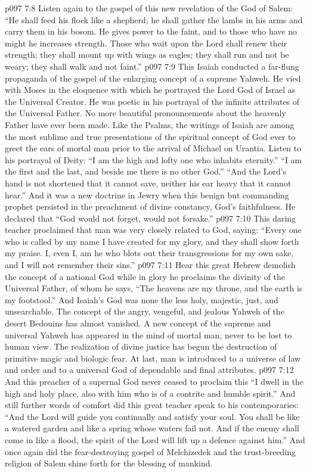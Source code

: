 \vs p097 7:8 Listen again to the gospel of this new revelation of the God of Salem: “He shall feed his flock like a shepherd; he shall gather the lambs in his arms and carry them in his bosom. He gives power to the faint, and to those who have no might he increases strength. Those who wait upon the Lord shall renew their strength; they shall mount up with wings as eagles; they shall run and not be weary; they shall walk and not faint.”
\vs p097 7:9 This Isaiah conducted a far\hyp{}flung propaganda of the gospel of the enlarging concept of a supreme Yahweh. He vied with Moses in the eloquence with which he portrayed the Lord God of Israel as the Universal Creator. He was poetic in his portrayal of the infinite attributes of the Universal Father. No more beautiful pronouncements about the heavenly Father have ever been made. Like the Psalms, the writings of Isaiah are among the most sublime and true presentations of the spiritual concept of God ever to greet the ears of mortal man prior to the arrival of Michael on Urantia. Listen to his portrayal of Deity: “I am the high and lofty one who inhabits eternity.” “I am the first and the last, and beside me there is no other God.” “And the Lord’s hand is not shortened that it cannot save, neither his ear heavy that it cannot hear.” And it was a new doctrine in Jewry when this benign but commanding prophet persisted in the preachment of divine constancy, God’s faithfulness. He declared that “God would not forget, would not forsake.”
\vs p097 7:10 This daring teacher proclaimed that man was very closely related to God, saying: “Every one who is called by my name I have created for my glory, and they shall show forth my praise. I, even I, am he who blots out their transgressions for my own sake, and I will not remember their sins.”
\vs p097 7:11 Hear this great Hebrew demolish the concept of a national God while in glory he proclaims the divinity of the Universal Father, of whom he says, “The heavens are my throne, and the earth is my footstool.” And Isaiah’s God was none the less holy, majestic, just, and unsearchable. The concept of the angry, vengeful, and jealous Yahweh of the desert Bedouins has almost vanished. A new concept of the supreme and universal Yahweh has appeared in the mind of mortal man, never to be lost to human view. The realization of divine justice has begun the destruction of primitive magic and biologic fear. At last, man is introduced to a universe of law and order and to a universal God of dependable and final attributes.
\vs p097 7:12 And this preacher of a supernal God never ceased to proclaim this  “I dwell in the high and holy place, also with him who is of a contrite and humble spirit.” And still further words of comfort did this great teacher speak to his contemporaries: “And the Lord will guide you continually and satisfy your soul. You shall be like a watered garden and like a spring whose waters fail not. And if the enemy shall come in like a flood, the spirit of the Lord will lift up a defence against him.” And once again did the fear\hyp{}destroying gospel of Melchizedek and the trust\hyp{}breeding religion of Salem shine forth for the blessing of mankind.
